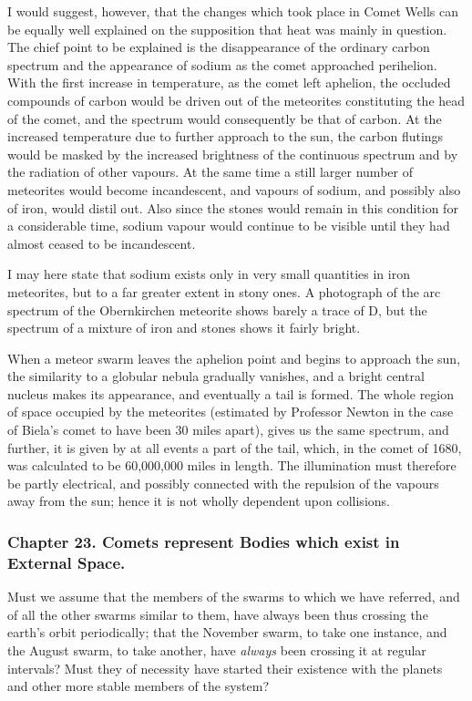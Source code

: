 \documentclass[a4paper, 12pt, oneside, polutonikogreek, english]{article}
\begin{document}
I would suggest, however, that the changes which took place in Comet Wells can be equally well explained on the supposition that heat was mainly in question. The chief point to be explained is the disappearance of the ordinary carbon spectrum and the appearance of sodium as the comet approached perihelion. With the first increase in temperature, as the comet left aphelion, the occluded compounds of carbon would be driven out of the meteorites constituting the head of the comet, and the spectrum would consequently be that of carbon. At the increased temperature due to further approach to the sun, the carbon flutings would be masked by the increased brightness of the continuous spectrum and by the radiation of other vapours. At the same time a still larger number of meteorites would become incandescent, and vapours of sodium, and possibly also of iron, would distil out. Also since the stones would remain in this condition for a considerable time, sodium vapour would continue to be visible until they had almost ceased to be incandescent.

I may here state that sodium exists only in very small quantities in iron meteorites, but to a far greater extent in stony ones. A photograph of the arc spectrum of the Obernkirchen meteorite shows barely a trace of D, but the spectrum of a mixture of iron and stones shows it fairly bright.

When a meteor swarm leaves the aphelion point and begins to approach the sun, the similarity to a globular nebula gradually vanishes, and a bright central nucleus makes its appearance, and eventually a tail is formed. The whole region of space occupied by the meteorites (estimated by Professor Newton in the case of Biela's comet to have been 30 miles apart), gives us the same spectrum, and further, it is given by at all events a part of the tail, which, in the comet of 1680, was calculated to be 60,000,000 miles in length. The illumination must therefore be partly electrical, and possibly connected with the repulsion of the vapours away from the sun; hence it is not wholly dependent upon collisions.

\subsubsection{Chapter 23. Comets represent Bodies which exist in External Space.}

Must we assume that the members of the swarms to which we have referred, and of all the other swarms similar to them, have always been thus crossing the earth's orbit periodically; that the November swarm, to take one instance, and the August swarm, to take another, have \emph{always} been crossing it at regular intervals? Must they of necessity have started their existence with the planets and other more stable members of the system?
\end{document}
